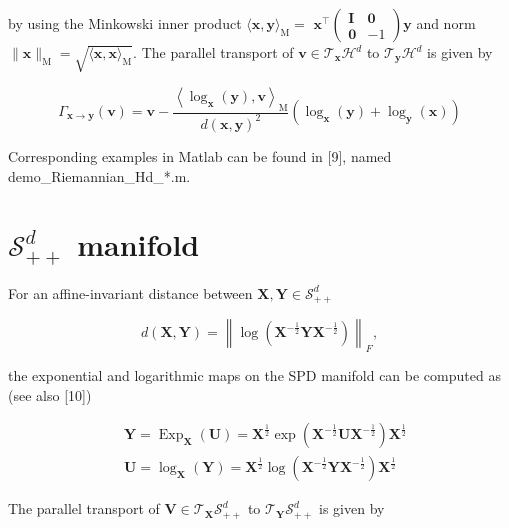 \documentclass[10pt]{article}
\begin{document}
by using the Minkowski inner product $\langle\boldsymbol{x}, \boldsymbol{y}\rangle_{\mathrm{M}}=$ $\boldsymbol{x}^{\top}\left(\begin{array}{cc}\boldsymbol{I} & \mathbf{0} \\ \mathbf{0} & -1\end{array}\right) \boldsymbol{y}$ and norm $\|\boldsymbol{x}\|_{\mathrm{M}}=\sqrt{\langle\boldsymbol{x}, \boldsymbol{x}\rangle_{\mathrm{M}}}$. The parallel transport of $\boldsymbol{v} \in \mathcal{T}_{\boldsymbol{x}} \mathcal{H}^{d}$ to $\mathcal{T}_{\boldsymbol{y}} \mathcal{H}^{d}$ is given by

$$
\Gamma_{\boldsymbol{x} \rightarrow \boldsymbol{y}}(\boldsymbol{v})=\boldsymbol{v}-\frac{\left\langle\log _{\boldsymbol{x}}(\boldsymbol{y}), \boldsymbol{v}\right\rangle_{\mathrm{M}}}{d(\boldsymbol{x}, \boldsymbol{y})^{2}}\left(\log _{\boldsymbol{x}}(\boldsymbol{y})+\log _{\boldsymbol{y}}(\boldsymbol{x})\right)
$$

Corresponding examples in Matlab can be found in [9], named demo\_Riemannian\_Hd\_*.m.

\section{$\mathcal{S}_{++}^{d}$ manifold}
For an affine-invariant distance between $\boldsymbol{X}, \boldsymbol{Y} \in \mathcal{S}_{++}^{d}$

$$
d(\boldsymbol{X}, \boldsymbol{Y})=\left\|\log \left(\boldsymbol{X}^{-\frac{1}{2}} \boldsymbol{Y} \boldsymbol{X}^{-\frac{1}{2}}\right)\right\|_{F},
$$

the exponential and logarithmic maps on the SPD manifold can be computed as (see also [10])

$$
\begin{aligned}
& \boldsymbol{Y}=\operatorname{Exp}_{\boldsymbol{X}}(\boldsymbol{U})=\boldsymbol{X}^{\frac{1}{2}} \exp \left(\boldsymbol{X}^{-\frac{1}{2}} \boldsymbol{U} \boldsymbol{X}^{-\frac{1}{2}}\right) \boldsymbol{X}^{\frac{1}{2}} \\
& \boldsymbol{U}=\log _{\boldsymbol{X}}(\boldsymbol{Y})=\boldsymbol{X}^{\frac{1}{2}} \log \left(\boldsymbol{X}^{-\frac{1}{2}} \boldsymbol{Y} \boldsymbol{X}^{-\frac{1}{2}}\right) \boldsymbol{X}^{\frac{1}{2}}
\end{aligned}
$$

The parallel transport of $\boldsymbol{V} \in \mathcal{T}_{\boldsymbol{X}} \mathcal{S}_{++}^{d}$ to $\mathcal{T}_{\boldsymbol{Y}} \mathcal{S}_{++}^{d}$ is given by
\end{document}
